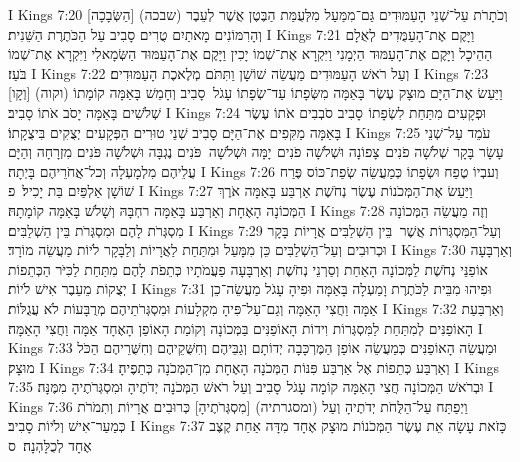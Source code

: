 I Kings 7:20	וְכֹתָרֹת עַל־שְׁנֵי הָעַמּוּדִים גַּם־מִמַּעַל מִלְּעֻמַּת הַבֶּטֶן אֲשֶׁר לְעֵבֶר (שבכה) [הַשְּׂבָכָה] וְהָרִמּוֹנִים מָאתַיִם טֻרִים סָבִיב עַל הַכֹּתֶרֶת הַשֵּׁנִית׃
I Kings 7:21	וַיָּקֶם אֶת־הָעַמֻּדִים לְאֻלָם הַהֵיכָל וַיָּקֶם אֶת־הָעַמּוּד הַיְמָנִי וַיִּקְרָא אֶת־שְׁמוֹ יָכִין וַיָּקֶם אֶת־הָעַמּוּד הַשְּׂמָאלִי וַיִּקְרָא אֶת־שְׁמוֹ בֹּעַז׃
I Kings 7:22	וְעַל רֹאשׁ הָעַמּוּדִים מַעֲשֵׂה שׁוֹשָׁן וַתִּתֹּם מְלֶאכֶת הָעַמּוּדִים׃
I Kings 7:23	וַיַּעַשׂ אֶת־הַיָּם מוּצָק עֶשֶׂר בָּאַמָּה מִשְּׂפָתוֹ עַד־שְׂפָתוֹ עָגֹל  סָבִיב וְחָמֵשׁ בָּאַמָּה קוֹמָתוֹ (וקוה) [וְקָו] שְׁלֹשִׁים בָּאַמָּה יָסֹב אֹתוֹ סָבִיב׃
I Kings 7:24	וּפְקָעִים מִתַּחַת לִשְׂפָתוֹ  סָבִיב סֹבְבִים אֹתוֹ עֶשֶׂר בָּאַמָּה מַקִּפִים אֶת־הַיָּם סָבִיב שְׁנֵי טוּרִים הַפְּקָעִים יְצֻקִים בִּיצֻקָתוֹ׃
I Kings 7:25	עֹמֵד עַל־שְׁנֵי עָשָׂר בָּקָר שְׁלֹשָׁה פֹנִים  צָפוֹנָה וּשְׁלֹשָׁה פֹנִים  יָמָּה וּשְׁלֹשָׁה  פֹּנִים נֶגְבָּה וּשְׁלֹשָׁה פֹּנִים מִזְרָחָה וְהַיָּם עֲלֵיהֶם מִלְמָעְלָה וְכל־אֲחֹרֵיהֶם בָּיְתָה׃
I Kings 7:26	וְעבְיוֹ טֶפַח וּשְׂפָתוֹ כְּמַעֲשֵׂה שְׂפַת־כּוֹס פֶּרַח שׁוֹשָׁן אַלְפַּיִם בַּת יָכִיל׃ {פ}
I Kings 7:27	וַיַּעַשׂ אֶת־הַמְּכֹנוֹת עֶשֶׂר נְחֹשֶׁת אַרְבַּע בָּאַמָּה אֹרֶךְ הַמְּכוֹנָה הָאֶחָת וְאַרְבַּע בָּאַמָּה רחְבָּהּ וְשָׁלֹשׁ בָּאַמָּה קוֹמָתָהּ׃
I Kings 7:28	וְזֶה מַעֲשֵׂה הַמְּכוֹנָה מִסְגְּרֹת לָהֶם וּמִסְגְּרֹת בֵּין הַשְׁלַבִּים׃
I Kings 7:29	וְעַל־הַמִּסְגְּרוֹת אֲשֶׁר  בֵּין הַשְׁלַבִּים אֲרָיוֹת  בָּקָר וּכְרוּבִים וְעַל־הַשְׁלַבִּים כֵּן מִמָּעַל וּמִתַּחַת לַאֲרָיוֹת וְלַבָּקָר לֹיוֹת מַעֲשֵׂה מוֹרָד׃
I Kings 7:30	וְאַרְבָּעָה אוֹפַנֵּי נְחֹשֶׁת לַמְּכוֹנָה הָאַחַת וְסַרְנֵי נְחֹשֶׁת וְאַרְבָּעָה פַעֲמֹתָיו כְּתֵפֹת לָהֶם מִתַּחַת לַכִּיֹּר הַכְּתֵפוֹת יְצֻקוֹת מֵעֵבֶר אִישׁ לֹיוֹת׃
I Kings 7:31	וּפִיהוּ מִבֵּית לַכֹּתֶרֶת וָמַעְלָה בָּאַמָּה וּפִיהָ עָגֹל מַעֲשֵׂה־כֵן אַמָּה וַחֲצִי הָאַמָּה וְגַם־עַל־פִּיהָ מִקְלָעוֹת וּמִסְגְּרֹתֵיהֶם מְרֻבָּעוֹת לֹא עֲגֻלּוֹת׃
I Kings 7:32	וְאַרְבַּעַת הָאוֹפַנִּים לְמִתַּחַת לַמִּסְגְּרוֹת וִידוֹת הָאוֹפַנִּים בַּמְּכוֹנָה וְקוֹמַת הָאוֹפַן הָאֶחָד אַמָּה וַחֲצִי הָאַמָּה׃
I Kings 7:33	וּמַעֲשֵׂה הָאוֹפַנִּים כְּמַעֲשֵׂה אוֹפַן הַמֶּרְכָּבָה יְדוֹתָם וְגַבֵּיהֶם וְחִשֻּׁקֵיהֶם וְחִשֻּׁרֵיהֶם הַכֹּל מוּצָק׃
I Kings 7:34	וְאַרְבַּע כְּתֵפוֹת אֶל אַרְבַּע פִּנּוֹת הַמְּכֹנָה הָאֶחָת מִן־הַמְּכֹנָה כְּתֵפֶיהָ׃
I Kings 7:35	וּבְרֹאשׁ הַמְּכוֹנָה חֲצִי הָאַמָּה קוֹמָה עָגֹל  סָבִיב וְעַל רֹאשׁ הַמְּכֹנָה יְדֹתֶיהָ וּמִסְגְּרֹתֶיהָ מִמֶּנָּה׃
I Kings 7:36	וַיְפַתַּח עַל־הַלֻּחֹת יְדֹתֶיהָ וְעַל (ומסגרתיה) [מִסְגְּרֹתֶיהָ] כְּרוּבִים אֲרָיוֹת וְתִמֹרֹת כְּמַעַר־אִישׁ וְלֹיוֹת סָבִיב׃
I Kings 7:37	כָּזֹאת עָשָׂה אֵת עֶשֶׂר הַמְּכֹנוֹת מוּצָק אֶחָד מִדָּה אַחַת קֶצֶב אֶחָד לְכֻלָּהְנָה׃ {ס}        
